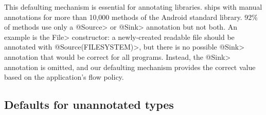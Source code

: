 \newcommand{\FCnumstubmethods}{10,553\xspace}
\newcommand{\FCnumstubmethodsrounded}{10,000\xspace}
\newcommand{\FCnumstubmethodswitheither}{915\xspace}
\newcommand{\FCnumstubmethodswithboth}{76\xspace}
\newcommand{\FCpercentstubmethodswithboth}{8\%\xspace}
\newcommand{\FCpercentstubmethodswithone}{92\%\xspace}

This defaulting mechanism is essential for annotating
libraries.  \TheFlowChecker ships with manual annotations for more than
\FCnumstubmethodsrounded methods of the Android standard library.
\FCpercentstubmethodswithone of methods use only a
\<@Source> or \<@Sink> annotation but not both.
An example is the \<File> constructor:
a newly-created readable file should be annotated with
\<@Source(FILESYSTEM)>, but there is no possible \<@Sink> annotation
that would be correct for all programs.
Instead, the \<@Sink> annotation is omitted, and
our defaulting mechanism provides the correct value
based on the application's flow policy.



\subsection{Defaults for unannotated types}
\label{sec:unannotated-types}


